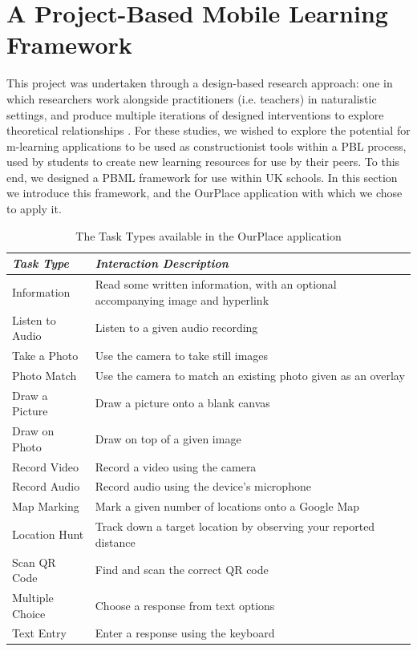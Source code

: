 \documentclass[,hyphens]{sigchi}
\begin{document}
\section{A Project-Based Mobile Learning Framework}
This project was undertaken through a design-based research approach: one in which researchers work alongside practitioners (i.e. teachers) in naturalistic settings, and produce multiple iterations of designed interventions to explore theoretical relationships \cite{Barab2004}. For these studies, we wished to explore the potential for m-learning applications to be used as constructionist tools within a PBL process, used by students to create new learning resources for use by their peers. To this end, we designed a PBML framework for use within UK schools. In this section we introduce this framework, and the OurPlace application with which we chose to apply it.

\begin{table}
  \centering
  \begin{tabular}{l|p{55mm}}
    {\small\textit{Task Type}}
    & {\small \textit{Interaction Description}} \\
    \midrule
    \small Information & \small Read some written information, with an optional accompanying image and hyperlink \\
    \small Listen to Audio & \small Listen to a given audio recording \\
    \small Take a Photo & \small Use the camera to take still images \\
    \small Photo Match & \small Use the camera to match an existing photo given as an overlay \\
    \small Draw a Picture & \small Draw a picture onto a blank canvas \\
    \small Draw on Photo & \small Draw on top of a given image \\
    \small Record Video & \small Record a video using the camera \\
    \small Record Audio & \small Record audio using the device's microphone \\
    \small Map Marking & \small Mark a given number of locations onto a Google Map \\
    \small Location Hunt & \small Track down a target location by observing your reported distance \\
    \small Scan QR Code & \small Find and scan the correct QR code \\
    \small Multiple Choice & \small Choose a response from text options \\
    \small Text Entry & \small Enter a response using the keyboard
  \end{tabular}
  \caption{The Task Types available in the OurPlace application}~\label{tab:TaskTypes}
  \vspace{-2em}
\end{table}
\end{document}
